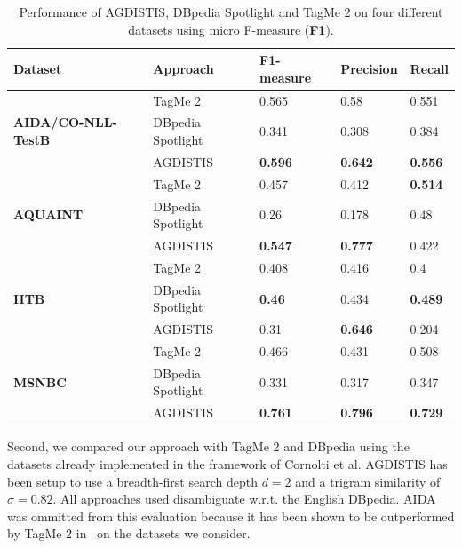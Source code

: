 \begin{table}
    \centering
\caption{Performance of AGDISTIS, DBpedia Spotlight and TagMe 2 on four different datasets using micro F-measure (\textbf{F1}).}
\begin{tabular}[tb]{@{}lllll@{}}
\toprule
Dataset                            & Approach          & \textbf{F1-measure}             & \textbf{Precision} & \textbf{Recall} \\ \midrule
\multirow{3}{*}{\begin{minipage}{0.8in}\textbf{AIDA/CO-NLL-TestB}\end{minipage}} & TagMe 2           & 0.565          & 0.58      & 0.551  \\
                                   & DBpedia Spotlight & 0.341          & 0.308     & 0.384  \\
                                   & AGDISTIS          & \textbf{0.596} & \textbf{0.642}     & \textbf{0.556}  \\ \midrule
\multirow{3}{*}{\textbf{AQUAINT}}  & TagMe 2           & 0.457          & 0.412     & \textbf{0.514}  \\
                                   & DBpedia Spotlight & 0.26           & 0.178     & 0.48   \\
                                   & AGDISTIS          & \textbf{0.547} & \textbf{0.777}     & 0.422  \\\midrule
\multirow{3}{*}{\textbf{IITB}}     & TagMe 2           & 0.408          & 0.416     & 0.4    \\
                                   & DBpedia Spotlight & \textbf{0.46}  & 0.434     & \textbf{0.489}  \\
                                   & AGDISTIS          & 0.31           & \textbf{0.646}     & 0.204  \\\midrule
\multirow{3}{*}{\textbf{MSNBC}}    & TagMe 2           & 0.466          & 0.431     & 0.508  \\
                                   & DBpedia Spotlight & 0.331          & 0.317     & 0.347  \\
                                   & AGDISTIS          & \textbf{0.761} & \textbf{0.796}     & \textbf{0.729}  \\ \bottomrule
\end{tabular}
\label{tab:evalnew}
\end{table}

Second, we compared our approach with TagMe 2 and DBpedia using the datasets already implemented in the framework of Cornolti et al.
AGDISTIS has been setup to use a breadth-first search depth $d=2$ and a trigram similarity of $\sigma=0.82$.
All approaches used disambiguate w.r.t. the English DBpedia.
AIDA was ommitted from this evaluation because it has been shown to be outperformed by TagMe 2 in~\cite{cornolti} on the datasets we consider. 


